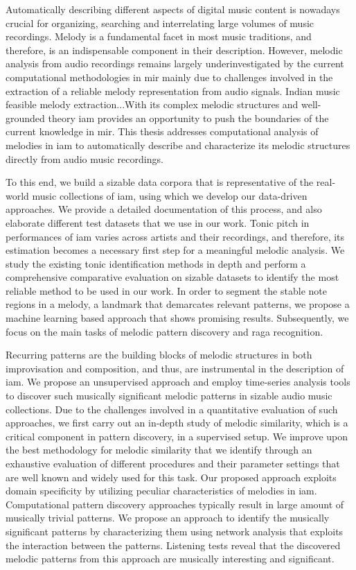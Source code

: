 
Automatically describing different aspects of digital music content is nowadays crucial for organizing, searching and interrelating large volumes of music recordings. Melody is a fundamental facet in most music traditions, and therefore, is an indispensable component in their description. However, melodic analysis from audio recordings remains largely underinvestigated by the current computational methodologies in \gls{mir} mainly due to challenges involved in the extraction of a reliable melody representation from audio signals. Indian music feasible melody extraction...With its complex melodic structures and well-grounded theory \gls{iam} provides an opportunity to push the boundaries of the current knowledge in \gls{mir}.  This thesis addresses computational analysis of melodies in \gls{iam} to automatically describe and characterize its melodic structures directly from audio music recordings. 

To this end, we build a sizable data corpora that is representative of the real-world music collections of \gls{iam}, using which we develop our data-driven approaches. We provide a detailed documentation of this process, and also elaborate different test datasets that we use in our work. Tonic pitch in performances of \gls{iam} varies across artists and their recordings, and therefore, its estimation becomes a necessary first step for a meaningful melodic analysis.  We study the existing tonic identification methods in depth and perform a comprehensive comparative evaluation on sizable datasets to identify the most reliable method to be used in our work. In order to segment the stable note regions in a melody, a landmark that demarcates relevant patterns, we propose a machine learning based approach that shows promising results. Subsequently, we focus on the main tasks of melodic pattern discovery and raga recognition. 

Recurring patterns are the building blocks of melodic structures in both improvisation and composition, and thus, are instrumental in the description of \gls{iam}. We propose an unsupervised approach and employ time-series analysis tools to discover such musically significant melodic patterns in sizable audio music collections. Due to the challenges involved in a quantitative evaluation of such approaches, we first carry out an in-depth study of  melodic similarity, which is a critical component in pattern discovery, in a supervised setup. We improve upon the best methodology for melodic similarity that we identify through an exhaustive evaluation of different procedures and their parameter settings that are well known and widely used for this task. Our proposed approach exploits domain specificity by utilizing peculiar characteristics of melodies in \gls{iam}. Computational pattern discovery approaches typically result in large amount of musically trivial patterns. We propose an approach to identify the musically significant patterns by characterizing them using network analysis that exploits the interaction between the patterns. Listening tests reveal that the discovered melodic patterns from this approach are musically interesting and significant.

